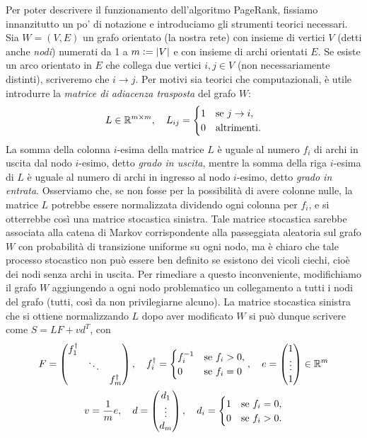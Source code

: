 Per poter descrivere il funzionamento dell'algoritmo PageRank, fissiamo
innanzitutto un po' di notazione e introduciamo gli strumenti teorici
necessari. Sia $W = (V,E)$ un grafo orientato (la nostra rete) con insieme
di vertici $V$ (detti anche \emph{nodi}) numerati da 1 a $m \vcentcolon= \left\lvert V\right\rvert$
e con insieme di archi orientati $E$. Se esiste un arco orientato in $E$
che collega due vertici $i,j \in V$ (non necessariamente distinti),
scriveremo che $i \to j$. Per motivi sia teorici che computazionali,
è utile introdurre la \emph{matrice di adiacenza trasposta} del grafo $W$:
\[
L \in \mathbb{R}^{m \times m}, \quad
L_{ij} = \begin{cases}
1 & \text{se $j \to i$},\\
0 & \text{altrimenti}.
\end{cases}
\]
La somma della colonna $i$-esima della matrice $L$ è uguale al numero $f_i$
di archi in uscita dal nodo $i$-esimo, detto \emph{grado in uscita},
mentre la somma della riga $i$-esima di $L$ è uguale al numero di archi
in ingresso al nodo $i$-esimo, detto \emph{grado in entrata}.
Osserviamo che, se non fosse per la possibilità di avere colonne nulle,
la matrice $L$ potrebbe essere normalizzata dividendo ogni colonna per $f_i$,
e si otterrebbe così una matrice stocastica sinistra.
Tale matrice stocastica sarebbe associata alla catena di Markov corrispondente
alla passeggiata aleatoria sul grafo $W$ con probabilità di transizione
uniforme su ogni nodo, ma è chiaro che tale processo stocastico non
può essere ben definito se esistono dei vicoli ciechi, cioè dei nodi senza
archi in uscita. Per rimediare a questo inconveniente, modifichiamo
il grafo $W$ aggiungendo a ogni nodo problematico un collegamento
a tutti i nodi del grafo (tutti, così da non privilegiarne alcuno).
La matrice stocastica sinistra che si ottiene normalizzando $L$
dopo aver modificato $W$ si può dunque scrivere come $S = LF + vd^T$, con
\begin{gather*}
F = \begin{pmatrix}
f_1^\dagger &        &  \\ 
            & \ddots &  \\ 
            &        & f_m^\dagger
\end{pmatrix}, \quad
f_i^\dagger = \begin{cases}
f_i^{-1} & \text{se $f_i > 0$},\\
0        & \text{se $f_i = 0$}
\end{cases}, \quad
e = \begin{pmatrix}
1 \\ \vdots \\ 1
\end{pmatrix} \in \mathbb{R}^m \\
v = \frac{1}{m} e, \quad
d = \begin{pmatrix}
d_1 \\ \vdots \\ d_m
\end{pmatrix}, \quad
d_i = \begin{cases}
1 & \text{se $f_i = 0$},\\
0 & \text{se $f_i > 0$}.
\end{cases}
\end{gather*}
